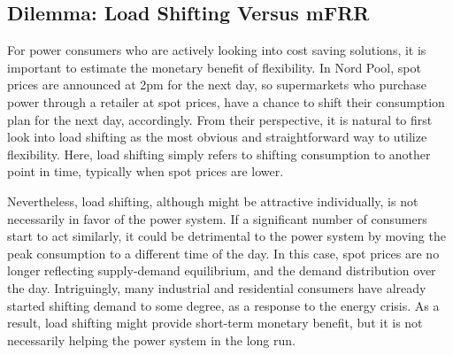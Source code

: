 



\IEEEpubidadjcol

\vspace{-1mm}
\subsection{Dilemma: Load Shifting Versus mFRR}
%
For power consumers who are actively looking into cost saving solutions, it is important to estimate the monetary benefit of flexibility. In Nord Pool, spot prices are announced at 2pm for the next day, so supermarkets who purchase power through a retailer at  spot prices, have a chance to shift their consumption plan for the next day, accordingly. From their perspective, it is natural to first look into load shifting as the most obvious and straightforward way to utilize flexibility. Here, load shifting simply refers to shifting consumption to another point in time, typically when spot prices are lower.

Nevertheless, load shifting, although might be attractive individually, is not necessarily in  favor of the power system.
If a significant number of consumers start to act similarly, it could be detrimental to the power system by moving the peak consumption to a different time of the day. In this case, spot prices are no longer reflecting supply-demand equilibrium, and the demand distribution over the day.
Intriguingly, many industrial and residential consumers have already started shifting demand to some degree, as a response to the energy crisis.
As a result, load shifting might provide short-term monetary benefit, but it is not necessarily helping the power system in the long run.

